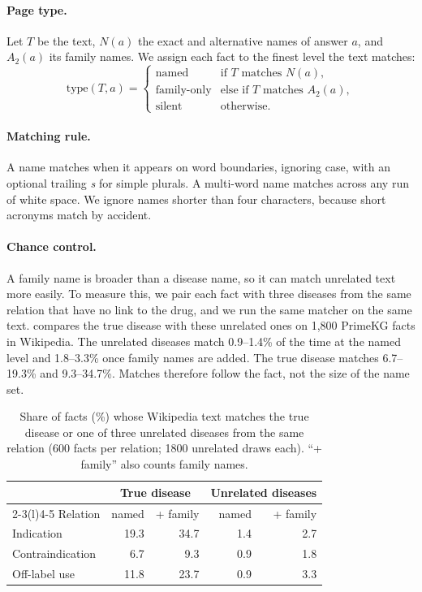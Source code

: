 \paragraph{Page type.}
Let $T$ be the text, $N(a)$ the exact and alternative names of answer $a$, and $A_2(a)$ its family names. We assign each fact to the finest level the text matches:
\begin{equation}
\mathrm{type}(T,a)=
\begin{cases}
\text{named} & \text{if } T \text{ matches } N(a),\\
\text{family-only} & \text{else if } T \text{ matches } A_2(a),\\
\text{silent} & \text{otherwise.}
\end{cases}
\end{equation}

\paragraph{Matching rule.}
A name matches when it appears on word boundaries, ignoring case, with an optional trailing \emph{s} for simple plurals. A multi-word name matches across any run of white space. We ignore names shorter than four characters, because short acronyms match by accident.

\paragraph{Chance control.}
A family name is broader than a disease name, so it can match unrelated text more easily. To measure this, we pair each fact with three diseases from the same relation that have no link to the drug, and we run the same matcher on the same text.  compares the true disease with these unrelated ones on 1,800 PrimeKG facts in Wikipedia. The unrelated diseases match 0.9--1.4\% of the time at the named level and 1.8--3.3\% once family names are added. The true disease matches 6.7--19.3\% and 9.3--34.7\%. Matches therefore follow the fact, not the size of the name set.

\begin{table}[t]
\centering
\footnotesize
\setlength{\tabcolsep}{3.5pt}
\begin{tabular}{@{}lrrrr@{}}
\toprule
 & \multicolumn{2}{c}{True disease} & \multicolumn{2}{c}{Unrelated diseases} \\
\cmidrule(lr){2-3}\cmidrule(l){4-5}
Relation & named & + family & named & + family \\
\midrule
Indication & 19.3 & 34.7 & 1.4 & 2.7 \\
Contraindication & 6.7 & 9.3 & 0.9 & 1.8 \\
Off-label use & 11.8 & 23.7 & 0.9 & 3.3 \\
\bottomrule
\end{tabular}
\caption{Share of facts (\%) whose Wikipedia text matches the true disease or one of three unrelated diseases from the same relation (600 facts per relation; \num{1800} unrelated draws each). ``+ family'' also counts family names.}
\label{tab:floor}
\end{table}

